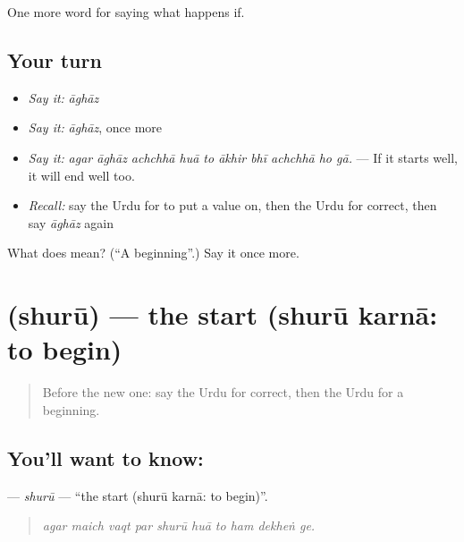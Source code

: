 \begin{grammarlens}[title={What you've built}]
One more word for saying what happens if.
\end{grammarlens}

\subsection*{Your turn}
\begin{itemize}
\raggedright
  \item \emph{Say it:} \emph{āghāz}
  \item \emph{Say it:} \emph{āghāz}, once more
  \item \emph{Say it:} \emph{agar āghāz achchhā huā to ākhir bhī achchhā ho gā.} — If it starts well, it will end well too.
  \item \emph{Recall:} say the Urdu for to put a value on, then the Urdu for correct, then say \emph{āghāz} again
\end{itemize}

\begin{tcolorbox}[breakable,colback=teal!4,colframe=teal!35!black,title={Before you move on}]
What does  mean? (\textquotedblleft{}A beginning\textquotedblright{}.) Say it once more.
\end{tcolorbox}
\section[\texorpdfstring{\ur{شروع} (shurū)}{شروع (shurū)}]{ (shurū) — the start (shurū karnā: to begin)}

\label{lesson:UR-C544-shuru}



\begin{quote}
Before the new one: say the Urdu for correct, then the Urdu for a beginning.
\end{quote}

\subsection*{You'll want to know: }
\textbf{} — \emph{shurū} — \textquotedblleft{}the start (shurū karnā: to begin)\textquotedblright{}.

\begin{quote}
         
\end{quote}

\begin{quote}
\emph{agar maich vaqt par shurū huā to ham dekheṅ ge.}
\end{quote}


